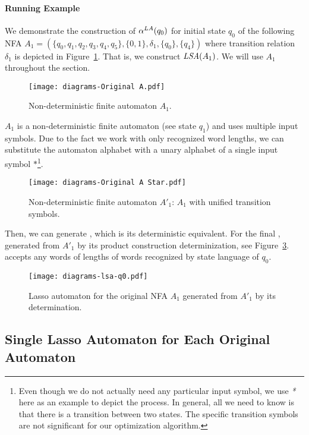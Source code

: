 \paragraph{Running Example}

We demonstrate the construction of $\alpha^{LA}(q_0)$ for initial state $q_0$ of the following NFA $A_1 = (\{q_0, q_1, q_2, q_3, q_4, q_5\}, \{0, 1\}, \delta_1, \{q_0\}, \{q_4\})$ where transition relation $\delta_1$ is depicted in Figure~\ref{fig:NFA_A1_orig}. That is, we construct $\emph{LSA}(A_1)$. We will use $A_1$ throughout the section.

\begin{figure}[ht]
	\centering
	\texttt{[image: diagrams-Original A.pdf]}
	\caption{Non-deterministic finite automaton $A_1$.}
	\label{fig:NFA_A1_orig}
\end{figure}

$A_1$ is a non-deterministic finite automaton (see state $q_1$) and uses multiple input symbols. Due to the fact we work with only recognized word lengths, we can substitute the automaton alphabet with a unary alphabet of a single input symbol $*$\footnote{Even though we do not actually need any particular input symbol, we use \emph{*} here as an example to depict the process. In general, all we need to know is that there is a transition between two states. The specific transition symbols are not significant for our optimization algorithm.}.

\begin{figure}[ht]
	\centering
	\texttt{[image: diagrams-Original A Star.pdf]}
	\caption{Non-deterministic finite automaton $A'_1$: $A_1$ with unified transition symbols.}
	\label{fig:NFA_A1_star}
\end{figure}

Then, we can generate , which is its deterministic equivalent. For the final , generated from $A'_1$ by its product construction determinization, see Figure~\ref{fig:HaL_A1}.  accepts any words of lengths of words recognized by state language of $q_0$.

\begin{figure}[ht]
	\centering
	\texttt{[image: diagrams-lsa-q0.pdf]}
	\caption{Lasso automaton  for the original NFA $A_1$ generated from $A'_1$ by its determination.}
	\label{fig:HaL_A1}
\end{figure}

\subsection{Single Lasso Automaton for Each Original Automaton}\label{sec:singleHaL}

